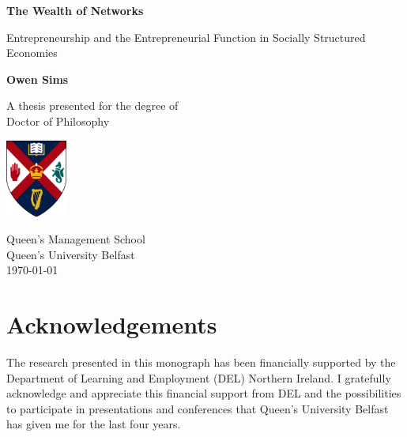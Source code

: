 \documentclass[11pt,fleqn]{book}
\begin{document}
\begin{titlepage}
    \begin{center}
        \vspace*{1cm}
        
        \huge
        \textbf{The Wealth of Networks}
        
        \vspace{0.5cm}
        \LARGE
        Entrepreneurship and the Entrepreneurial Function in Socially Structured Economies
        
        \vspace{1.5cm}
        
        \Large
        \textbf{Owen Sims}
        
        \vfill
        
        \large
        A thesis presented for the degree of\\
        Doctor of Philosophy
        
        \vspace{0.8cm}
        
        \includegraphics[width=0.15\textwidth]{imgs/qublogo2.png}
        
        \large
        Queen's Management School\\
        Queen's University Belfast\\
        \today
        
    \end{center}
\end{titlepage}


\thispagestyle{empty}

\newpage

\chapter*{Acknowledgements}

The research presented in this monograph has been financially supported by the Department of Learning and Employment (DEL) Northern Ireland. I gratefully acknowledge and appreciate this financial support from DEL and the possibilities to participate in presentations and conferences that Queen's University Belfast has given me for the last four years.
\end{document}
